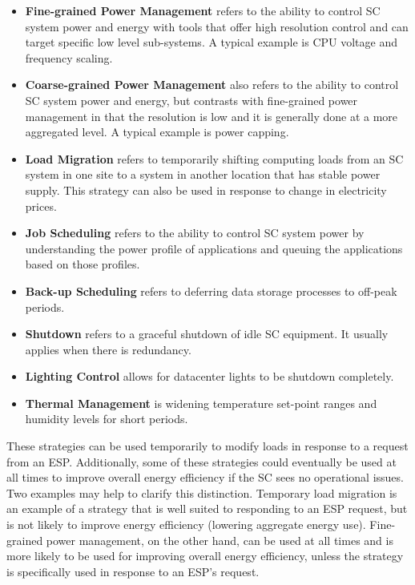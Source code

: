 \begin{itemize}
\item {\bf Fine-grained Power Management} refers to the ability to control SC system power 
and energy with tools that offer high resolution control and can target specific 
low level sub-systems. A typical example is CPU voltage and frequency scaling.

\item {\bf Coarse-grained Power Management} also refers to the ability to control SC 
system power and energy, but contrasts with fine-grained power management in 
that the resolution is low and it is generally done at a more aggregated level. 
A typical example is power capping.

\item {\bf Load Migration} refers to temporarily shifting computing loads from 
an SC system in one site to a system in another location that has stable power supply. 
This strategy can also be used in response to change in electricity prices.

\item {\bf Job Scheduling} refers to the ability to control SC system power 
by understanding the power profile of applications and queuing the 
applications based on those profiles.

\item {\bf Back-up Scheduling} refers to deferring data storage processes to off-peak periods.

\item {\bf Shutdown} refers to a graceful shutdown of idle SC equipment. It usually 
applies when there is redundancy.

\item {\bf Lighting Control} allows for datacenter lights to be shutdown completely.

\item {\bf Thermal Management} is widening temperature set-point ranges and 
humidity levels for short periods.
\end{itemize}

These strategies can be used temporarily to modify loads in response to a request from an ESP. Additionally, some of these strategies could eventually be used at all times to improve overall energy efficiency if the SC sees no operational issues. Two examples may help to clarify this distinction. Temporary load migration is an example of a strategy that is well suited to responding to an ESP request, but is not likely to improve energy efficiency (lowering aggregate energy use). Fine-grained power management, on the other hand, can be used at all times and is more likely to be used for improving overall energy efficiency, unless the strategy is specifically used in response to an ESP's request. 

